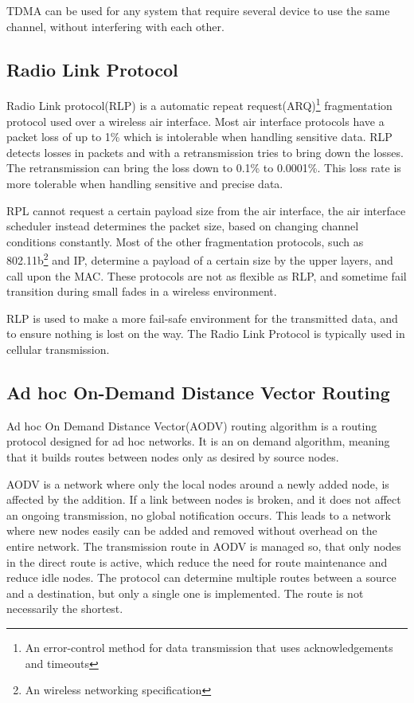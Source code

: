 TDMA can be used for any system that require several device to use the same channel, without interfering with each other.


\subsection{Radio Link Protocol}
Radio Link protocol(RLP) is a automatic repeat request(ARQ)\footnote{An error-control method for data transmission that uses acknowledgements and timeouts} fragmentation protocol used over a wireless air interface.
Most air interface protocols have a packet loss of up to 1\% which is intolerable when handling sensitive data.
RLP detects losses in packets and with a retransmission tries to bring down the losses.
The retransmission can bring the loss down to 0.1\% to 0.0001\%.
This loss rate is more tolerable when handling sensitive and precise data.

RPL cannot request a certain payload size from the air interface, the air interface scheduler instead determines the packet size, based on changing channel conditions constantly.
Most of the other fragmentation protocols, such as 802.11b\footnote{An wireless networking specification} and IP, determine a payload of a certain size by the upper layers, and call upon the MAC.
These protocols are not as flexible as RLP, and sometime fail transition during small fades in a wireless environment.\cite{MobileComm}

RLP is used to make a more fail-safe environment for the transmitted data, and to ensure nothing is lost on the way.
The Radio Link Protocol is typically used in cellular transmission.

\subsection{Ad hoc On-Demand Distance Vector Routing}
Ad hoc On Demand Distance Vector(AODV) routing algorithm is a routing protocol designed for ad hoc networks. 
It is an on demand algorithm, meaning that it builds routes between nodes only as desired by source nodes.\cite{AOVD1}

AODV is a network where only the local nodes around a newly added node, is affected by the addition.
If a link between nodes is broken, and it does not affect an ongoing transmission, no global notification occurs.
This leads to a network where new nodes easily can be added and removed without overhead on the entire network.
The transmission  route in AODV is managed so, that only nodes in the direct route is active, which reduce the need for route maintenance and reduce idle nodes.
The protocol can determine multiple routes between a source and a destination, but only a single one is implemented.
The route is not necessarily the shortest.

